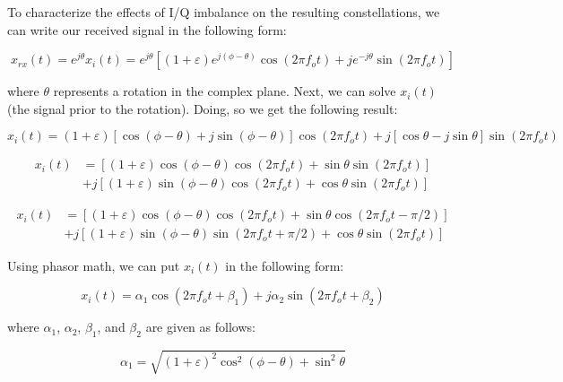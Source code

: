 \documentclass{article}
\begin{document}
To characterize the effects of I/Q imbalance on the resulting constellations, we can write our received signal in the following form:

\begin{equation}
	x_{rx}(t) = e^{j\theta}x_i(t) = e^{j\theta}\left[(1+\varepsilon)e^{j(\phi-\theta)}\cos(2{\pi}f_ot)+je^{-j\theta}\sin(2{\pi}f_ot)\right]
\end{equation}

where $\theta$ represents a rotation in the complex plane. Next, we can solve $x_i(t)$ (the signal prior to the rotation). Doing, so we get the following result:

\begin{equation}
	x_i(t) = (1+\varepsilon)[\cos(\phi-\theta)+j\sin(\phi-\theta)]\cos(2{\pi}f_ot)+j[\cos\theta-j\sin\theta]\sin(2{\pi}f_ot)
\end{equation}

\begin{equation}
\begin{split}
	x_i(t) &= \left[(1+\varepsilon)\cos(\phi-\theta)\cos(2{\pi}f_ot)+\sin\theta\sin(2{\pi}f_ot)\right]\\
	&+j\left[(1+\varepsilon)\sin(\phi-\theta)\cos(2{\pi}f_ot)+\cos\theta\sin(2{\pi}f_ot)\right]
\end{split}
\end{equation}

\begin{equation}
\begin{split}
	x_i(t) &= \left[(1+\varepsilon)\cos(\phi-\theta)\cos(2{\pi}f_ot)+\sin\theta\cos(2{\pi}f_ot-\pi/2)\right]\\
	&+j\left[(1+\varepsilon)\sin(\phi-\theta)\sin(2{\pi}f_ot+\pi/2)+\cos\theta\sin(2{\pi}f_ot)\right]
\end{split}
\end{equation}

Using phasor math, we can put $x_i(t)$ in the following form:

\begin{equation}
	x_i(t) = \alpha_1\cos(2{\pi}f_ot+\beta_1)+j\alpha_2\sin(2{\pi}f_ot+\beta_2)
\end{equation}

where $\alpha_1$, $\alpha_2$, $\beta_1$, and $\beta_2$ are given as follows:

\begin{equation}
	\alpha_1 = \sqrt{(1+\varepsilon)^2\cos^2(\phi-\theta)+\sin^2\theta}
\end{equation}
\end{document}
